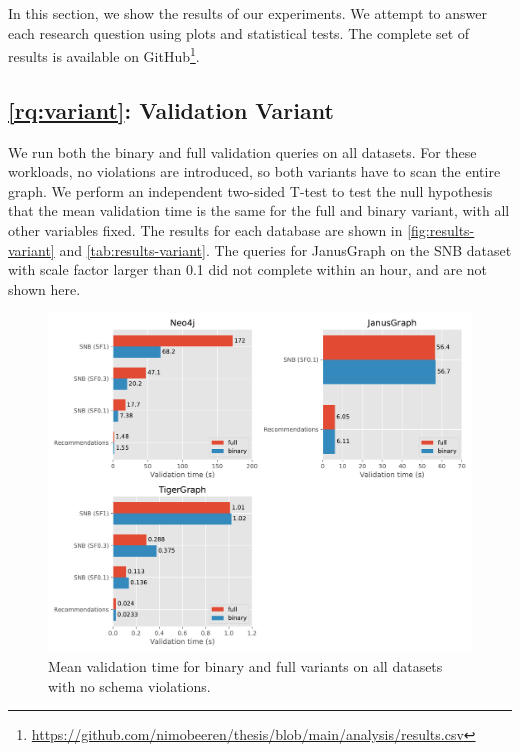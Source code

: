 \documentclass{report}
\theoremstyle{definition}
\begin{document}
In this section, we show the results of our experiments. We attempt to answer each research question using plots and statistical tests. The complete set of results is available on GitHub\footnote{\url{https://github.com/nimobeeren/thesis/blob/main/analysis/results.csv}}.

\subsection{\ref*{rq:variant}: Validation Variant}

We run both the binary and full validation queries on all datasets. For these workloads, no violations are introduced, so both variants have to scan the entire graph. We perform an independent two-sided T-test \citep{student1908probable} to test the null hypothesis that the mean validation time is the same for the full and binary variant, with all other variables fixed. The results for each database are shown in \autoref{fig:results-variant} and \autoref{tab:results-variant}. The queries for JanusGraph on the SNB dataset with scale factor larger than 0.1 did not complete within an hour, and are not shown here.

\begin{figure}[p]
  \centering
  \includegraphics[scale=0.5]{figures/results-variant.pdf}
  \caption[Mean validation time for full and binary variants]{Mean validation time for binary and full variants on all datasets with no schema violations.}
  \label{fig:results-variant}
\end{figure}
\end{document}
